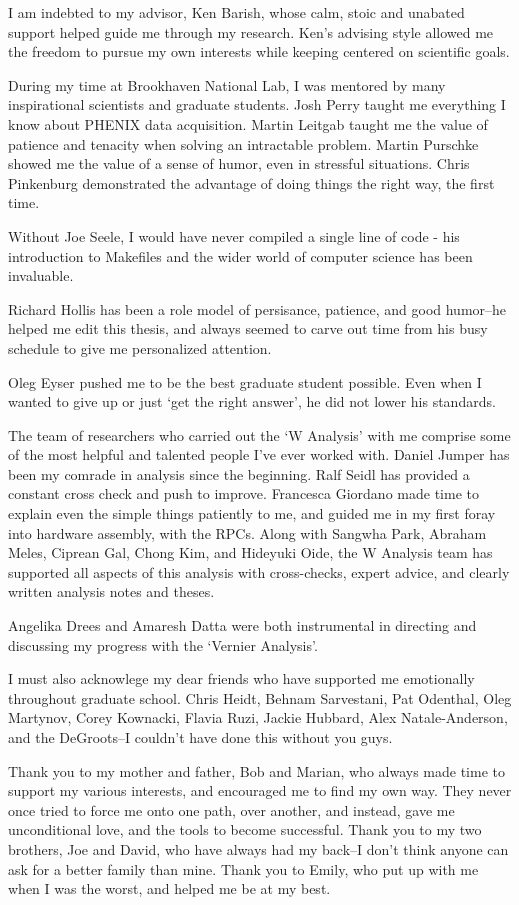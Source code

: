 I am indebted to my advisor, Ken Barish, whose calm, stoic and unabated support
helped guide me through my research. Ken's advising style allowed me the
freedom to pursue my own interests while keeping centered on scientific goals.

During my time at Brookhaven National Lab, I was mentored by many inspirational
scientists and graduate students. Josh Perry taught me everything I know about
PHENIX data acquisition. Martin Leitgab taught me the value of patience and
tenacity when solving an intractable problem. Martin Purschke showed me the
value of a sense of humor, even in stressful situations. Chris Pinkenburg
demonstrated the advantage of doing things the right way, the first time.

Without Joe Seele, I would have never compiled a single line of code - his
introduction to Makefiles and the wider world of computer science has been
invaluable. 

Richard Hollis has been a role model of persisance, patience, and good humor--he
helped me edit this thesis, and always seemed to carve out time from his
busy schedule to give me personalized attention.

Oleg Eyser pushed me to be the best graduate student possible. Even when I
wanted to give up or just `get the right answer', he did not lower his
standards.

The team of researchers who carried out the `W Analysis' with me comprise some
of the most helpful and talented people I've ever worked with. Daniel Jumper
has been my comrade in analysis since the beginning. Ralf Seidl has provided a
constant cross check and push to improve. Francesca Giordano made time to
explain even the simple things patiently to me, and guided me in my first foray
into hardware assembly, with the RPCs. Along with Sangwha Park, Abraham Meles,
Ciprean Gal, Chong Kim, and Hideyuki Oide, the W Analysis team has supported
all aspects of this analysis with cross-checks, expert advice, and clearly
written analysis notes and theses.

Angelika Drees and Amaresh Datta were both instrumental in directing and
discussing my progress with the `Vernier Analysis'.

I must also acknowlege my dear friends who have supported me emotionally
throughout graduate school. Chris Heidt, Behnam Sarvestani, Pat Odenthal, Oleg
Martynov, Corey Kownacki, Flavia Ruzi, Jackie Hubbard, Alex Natale-Anderson,
and the DeGroots--I couldn't have done this without you guys.

Thank you to my mother and father, Bob and Marian, who always made time to
support my various interests, and encouraged me to find my own way. They never
once tried to force me onto one path, over another, and instead, gave me
unconditional love, and the tools to become successful.  Thank you to my two
brothers, Joe and David, who have always had my back--I don't think anyone can
ask for a better family than mine.  Thank you to Emily, who put up with me when
I was the worst, and helped me be at my best.  
